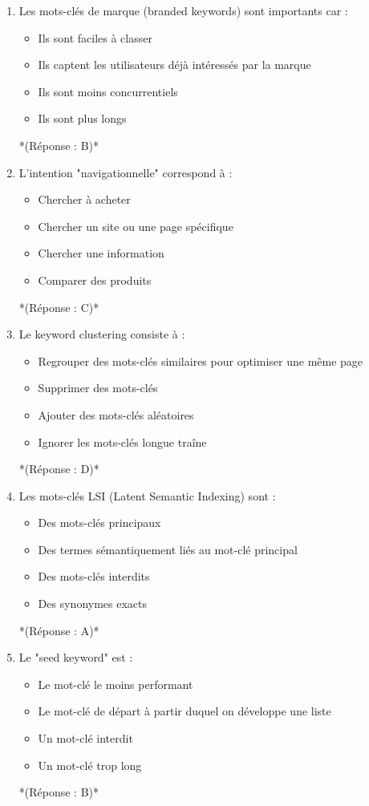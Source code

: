 \documentclass[12pt,a4paper,twoside]{report}
\begin{document}
\begin{enumerate}
\item Les mots-clés de marque (branded keywords) sont importants car :
\begin{itemize}
\item[A)] Ils sont faciles à classer
\item[B)] Ils captent les utilisateurs déjà intéressés par la marque
\item[C)] Ils sont moins concurrentiels
\item[D)] Ils sont plus longs
\end{itemize}
*(Réponse : B)*

\item L'intention "navigationnelle" correspond à :
\begin{itemize}
\item[A)] Chercher à acheter
\item[B)] Chercher un site ou une page spécifique
\item[C)] Chercher une information
\item[D)] Comparer des produits
\end{itemize}
*(Réponse : C)*

\item Le keyword clustering consiste à :
\begin{itemize}
\item[A)] Regrouper des mots-clés similaires pour optimiser une même page
\item[B)] Supprimer des mots-clés
\item[C)] Ajouter des mots-clés aléatoires
\item[D)] Ignorer les mots-clés longue traîne
\end{itemize}
*(Réponse : D)*

\item Les mots-clés LSI (Latent Semantic Indexing) sont :
\begin{itemize}
\item[A)] Des mots-clés principaux
\item[B)] Des termes sémantiquement liés au mot-clé principal
\item[C)] Des mots-clés interdits
\item[D)] Des synonymes exacts
\end{itemize}
*(Réponse : A)*

\item Le "seed keyword" est :
\begin{itemize}
\item[A)] Le mot-clé le moins performant
\item[B)] Le mot-clé de départ à partir duquel on développe une liste
\item[C)] Un mot-clé interdit
\item[D)] Un mot-clé trop long
\end{itemize}
*(Réponse : B)*
\end{enumerate}
\end{document}
